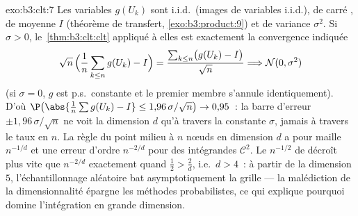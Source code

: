 \begin{solution}{exo:b3:clt:7}
Les variables $g(U_k)$ sont i.i.d.\ (images  de
variables i.i.d.), de carré , de moyenne $I$
(théorème de transfert, \cref{exo:b3:product:9}) et de
variance $\sigma^2$. Si $\sigma > 0$,
le~\cref{thm:b3:clt:clt} appliqué à elles est exactement la
convergence indiquée
\[
\sqrt n\,\Bigl(\frac1n\sum_{k\leq n}g(U_k) - I\Bigr) =
\frac{\sum_{k\leq n}\bigl(g(U_k) - I\bigr)}{\sqrt n}
\Longrightarrow \mathcal N(0, \sigma^2)
\]
(si $\sigma = 0$, $g$ est p.s.\ constante et le premier
membre s'annule identiquement). D'où
$\P\bigl(\abs{\frac1n\sum g(U_k) - I} \leq
1{,}96\,\sigma/\sqrt n\bigr) \to 0{,}95$~: la barre d'erreur
$\pm 1{,}96\,\sigma/\sqrt n$ ne voit la dimension $d$ qu'à
travers la constante $\sigma$, jamais à travers le taux en
$n$. La règle du point milieu à $n$ nœuds en dimension $d$ a
pour maille $n^{-1/d}$ et une erreur d'ordre $n^{-2/d}$ pour
des intégrandes $\mathcal C^2$. Le $n^{-1/2}$ de 
décroît plus vite que $n^{-2/d}$ exactement quand $\frac12 >
\frac2d$, i.e.\ $d > 4$~: à partir de la dimension $5$,
l'échantillonnage aléatoire bat asymptotiquement la grille
--- la malédiction de la dimensionnalité épargne les
méthodes probabilistes, ce qui explique pourquoi 
domine l'intégration en grande dimension.
\end{solution}

